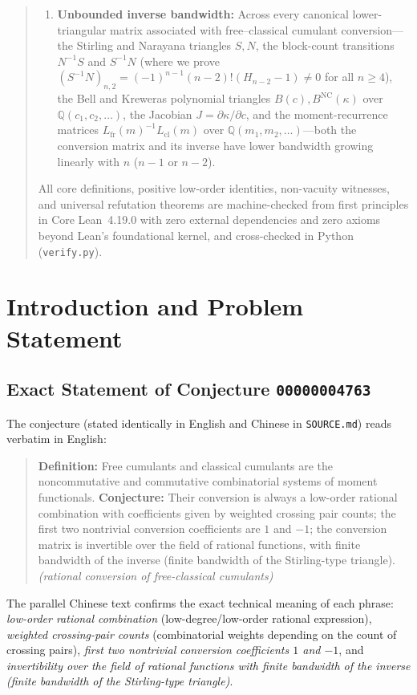 \documentclass[11pt,a4paper]{article}
\theoremstyle{definition}
\theoremstyle{remark}
\newcommand{\NC}{\mathrm{NC}}
\newcommand{\cl}{\mathrm{cl}}
\newcommand{\fr}{\mathrm{fr}}
\newcommand{\Q}{\mathbb{Q}}
\begin{document}
\begin{abstract}
\begin{enumerate}
  \item[(iv)] \textbf{Unbounded inverse bandwidth:} Across every canonical lower-triangular matrix associated with free--classical cumulant conversion---the Stirling and Narayana triangles $S, N$, the block-count transitions $N^{-1}S$ and $S^{-1}N$ (where we prove $(S^{-1}N)_{n,2} = (-1)^{n-1}(n-2)!(H_{n-2}-1) \ne 0$ for all $n \ge 4$), the Bell and Kreweras polynomial triangles $B(c), B^{\NC}(\kappa)$ over $\Q(c_1,c_2,\dots)$, the Jacobian $J = \partial\kappa/\partial c$, and the moment-recurrence matrices $L_{\fr}(m)^{-1}L_{\cl}(m)$ over $\Q(m_1,m_2,\dots)$---both the conversion matrix and its inverse have lower bandwidth growing linearly with $n$ ($n - 1$ or $n - 2$).
\end{enumerate}
All core definitions, positive low-order identities, non-vacuity witnesses, and universal refutation theorems are machine-checked from first principles in Core Lean~4.19.0 with zero external dependencies and zero axioms beyond Lean's foundational kernel, and cross-checked in Python (\texttt{verify.py}).
\end{abstract}

\section{Introduction and Problem Statement}

\subsection{Exact Statement of Conjecture \texttt{00000004763}}

The conjecture (stated identically in English and Chinese in \texttt{SOURCE.md}) reads verbatim in English:

\begin{quote}
\textbf{Definition:} Free cumulants and classical cumulants are the noncommutative and commutative combinatorial systems of moment functionals. \textbf{Conjecture:} Their conversion is always a low-order rational combination with coefficients given by weighted crossing pair counts; the first two nontrivial conversion coefficients are $1$ and $-1$; the conversion matrix is invertible over the field of rational functions, with finite bandwidth of the inverse (finite bandwidth of the Stirling-type triangle). \emph{(rational conversion of free-classical cumulants)}
\end{quote}

The parallel Chinese text confirms the exact technical meaning of each phrase: \emph{low-order rational combination} (low-degree/low-order rational expression), \emph{weighted crossing-pair counts} (combinatorial weights depending on the count of crossing pairs), \emph{first two nontrivial conversion coefficients $1$ and $-1$}, and \emph{invertibility over the field of rational functions with finite bandwidth of the inverse (finite bandwidth of the Stirling-type triangle)}.
\end{document}
